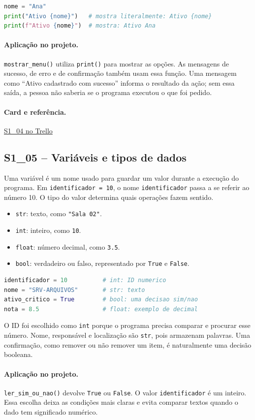 \documentclass[11pt,a4paper]{article}
\newcommand{\projeto}{\paragraph{Aplicação no projeto.}}
\newcommand{\referencia}[2]{\paragraph{Card e referência.}\href{#1}{#2}}
\newcommand{\cardsection}[1]{\Needspace{12\baselineskip}\subsection{#1}}
\begin{document}
\begin{lstlisting}[language=Python,caption={Diferença entre string comum e f-string}]
nome = "Ana"
print("Ativo {nome}")   # mostra literalmente: Ativo {nome}
print(f"Ativo {nome}")  # mostra: Ativo Ana
\end{lstlisting}

\projeto
\texttt{mostrar\_menu()} utiliza \texttt{print()} para mostrar as opções. As mensagens de sucesso, de erro e de confirmação também usam essa função. Uma mensagem como ``Ativo cadastrado com sucesso'' informa o resultado da ação; sem essa saída, a pessoa não saberia se o programa executou o que foi pedido.

\referencia{https://trello.com/c/YeugQuYt}{S1\_04 no Trello}

\cardsection{S1\_05 -- Variáveis e tipos de dados}

Uma variável é um nome usado para guardar um valor durante a execução do programa. Em \texttt{identificador = 10}, o nome \texttt{identificador} passa a se referir ao número 10. O tipo do valor determina quais operações fazem sentido.

\begin{itemize}
  \item \texttt{str}: texto, como \texttt{"Sala 02"}.
  \item \texttt{int}: inteiro, como \texttt{10}.
  \item \texttt{float}: número decimal, como \texttt{3.5}.
  \item \texttt{bool}: verdadeiro ou falso, representado por \texttt{True} e \texttt{False}.
\end{itemize}

\begin{lstlisting}[language=Python,caption={Tipos de dados no contexto do projeto}]
identificador = 10          # int: ID numerico
nome = "SRV-ARQUIVOS"       # str: texto
ativo_critico = True        # bool: uma decisao sim/nao
nota = 8.5                  # float: exemplo de decimal
\end{lstlisting}

O ID foi escolhido como \texttt{int} porque o programa precisa comparar e procurar esse número. Nome, responsável e localização são \texttt{str}, pois armazenam palavras. Uma confirmação, como remover ou não remover um item, é naturalmente uma decisão booleana.

\projeto
\texttt{ler\_sim\_ou\_nao()} devolve \texttt{True} ou \texttt{False}. O valor \texttt{identificador} é um inteiro. Essa escolha deixa as condições mais claras e evita comparar textos quando o dado tem significado numérico.
\end{document}
